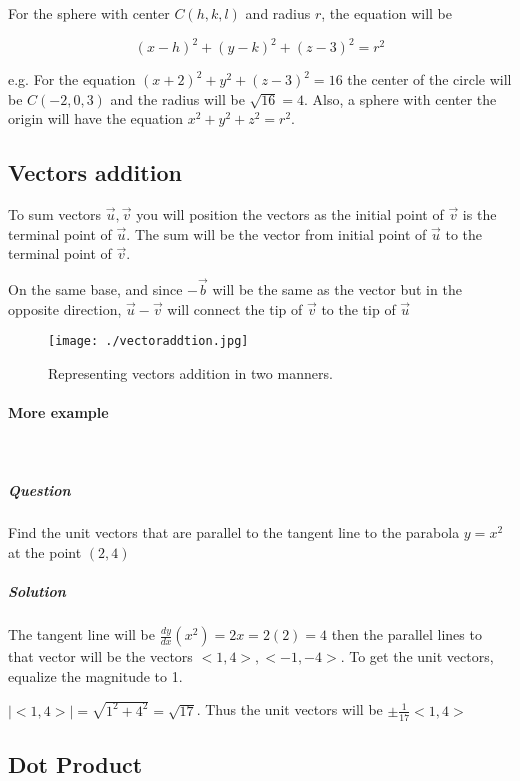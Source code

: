 \documentclass{article}
\begin{document}
	For the sphere with center $C(h,k,l)$ and radius $r$, the equation will be

	\begin{equation}
		(x-h)^2 + (y-k)^2 +(z-3)^2 = r^2
	\end{equation}

	e.g. For the equation $(x+2)^2 + y^2 + (z-3)^2 = 16$ the center of the circle will be $C(-2,0,3)$ and the radius will be $ \sqrt{16} = 4$. Also, a sphere with center the origin will have the equation $x^2+y^2+z^2=r^2$.

	\subsection{Vectors addition}

	To sum vectors $\vec{u}, \vec{v}$ you will position the vectors as the initial point of $\vec{v}$ is the terminal point of $\vec{u}$. The sum will be the vector from initial point of $\vec{u}$ to the terminal point of $\vec{v}$.

	On the same base, and since $-\vec{b}$ will be the same as the vector but in the opposite direction, $\vec{u} - \vec{v}$ will connect the tip of $\vec{v}$ to the tip of $\vec{u}$

	\begin{figure}[h!]
		\texttt{[image: ./vectoraddtion.jpg]}
		\caption{Representing vectors addition in two manners.}
	\end{figure}


	\paragraph{More example} \

	\subparagraph{Question}
	Find the unit vectors that are parallel to the tangent line to the parabola $y=x^2$ at the point $(2,4)$

	\subparagraph{Solution}
	The tangent line will be $ \frac{dy}{dx}(x^2) = 2x = 2(2) = 4$ then the parallel lines to that vector will be the vectors $<1,4>,<-1,-4>$. To get the unit vectors, equalize the magnitude to 1. 

	$|<1,4>| = \sqrt{1^2 + 4^2} = \sqrt{17}$. Thus the unit vectors will be $\pm\frac{1}{17}<1,4>$

	\newpage

	\subsection{Dot Product}
\end{document}
